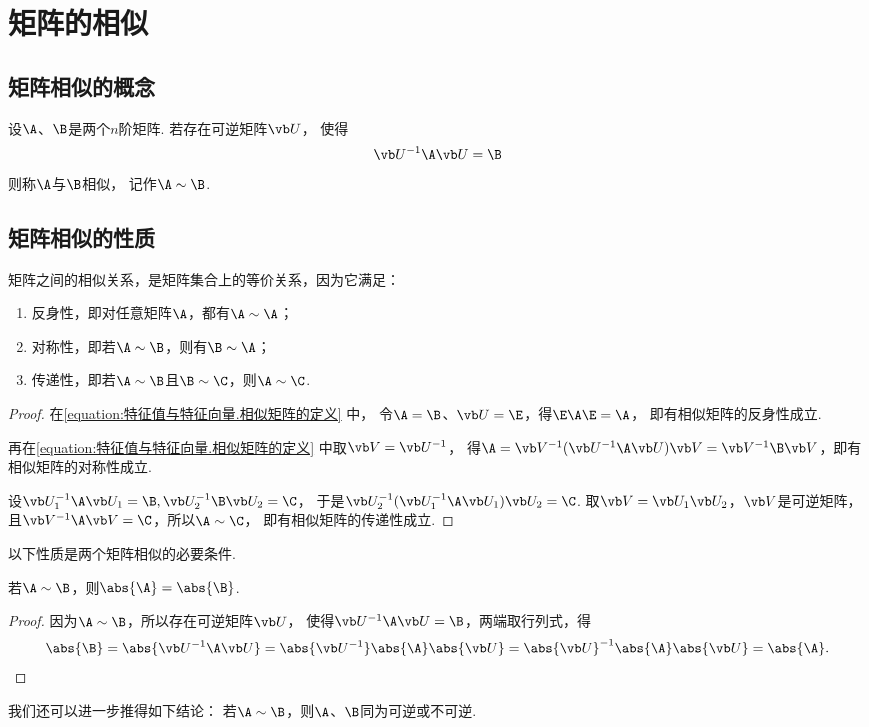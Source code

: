 \section{矩阵的相似}
\subsection{矩阵相似的概念}
\begin{definition}
设\(\A\)、\(\B\)是两个\(n\)阶矩阵.
若存在可逆矩阵\(\P\)，
使得\begin{equation}\label{equation:特征值与特征向量.相似矩阵的定义}
	\P^{-1}\A\P=\B
\end{equation}
则称\(\A\)与\(\B\)相似，
记作\(\A\sim\B\).
\end{definition}

\subsection{矩阵相似的性质}
\begin{property}\label{theorem:特征值与特征向量.相似关系是等价关系}
矩阵之间的相似关系，是矩阵集合上的等价关系，因为它满足：
\begin{enumerate}
	\item 反身性，即对任意矩阵\(\A\)，都有\(\A\sim\A\)；
	\item 对称性，即若\(\A\sim\B\)，则有\(\B\sim\A\)；
	\item 传递性，即若\(\A\sim\B\)且\(\B\sim\C\)，则\(\A\sim\C\).
\end{enumerate}
\begin{proof}
在\cref{equation:特征值与特征向量.相似矩阵的定义} 中，
令\(\A=\B\)、\(\P=\E\)，得\(\E\A\E=\A\)，
即有相似矩阵的反身性成立.

再在\cref{equation:特征值与特征向量.相似矩阵的定义} 中取\(\Q=\P^{-1}\)，
得\(\A = \Q^{-1}(\P^{-1}\A\P)\Q = \Q^{-1}\B\Q\)，即有相似矩阵的对称性成立.

设\(\P_1^{-1}\A\P_1=\B,
\P_2^{-1}\B\P_2=\C\)，
于是\(\P_2^{-1}(\P_1^{-1}\A\P_1)\P_2=\C\).
取\(\Q=\P_1\P_2\)，\(\Q\)是可逆矩阵，且\(\Q^{-1}\A\Q=\C\)，所以\(\A\sim\C\)，
即有相似矩阵的传递性成立.
\end{proof}
\end{property}

以下性质是两个矩阵相似的必要条件.
\begin{property}\label{theorem:特征值与特征向量.矩阵相似的必要条件1}
若\(\A\sim\B\)，则\(\abs{\A}=\abs{\B}\).
\begin{proof}
因为\(\A\sim\B\)，所以存在可逆矩阵\(\P\)，
使得\(\P^{-1}\A\P=\B\)，两端取行列式，得\[
	\abs{\B} = \abs{\P^{-1}\A\P}
	= \abs{\P^{-1}}\abs{\A}\abs{\P}
	= \abs{\P}^{-1}\abs{\A}\abs{\P}
	= \abs{\A}.
	\qedhere
\]
\end{proof}
\end{property}
我们还可以进一步推得如下结论：
若\(\A\sim\B\)，则\(\A\)、\(\B\)同为可逆或不可逆.

